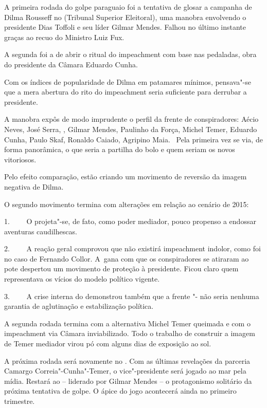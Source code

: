  

A primeira rodada do golpe paraguaio foi a tentativa de glosar a
campanha de Dilma Rousseff no  (Tribunal Superior Eleitoral), uma
manobra envolvendo o presidente Dias Toffoli e seu líder Gilmar Mendes.
Falhou no último instante graças ao recuo do Ministro Luiz Fux.

A segunda foi a de abrir o ritual do impeachment com base nas pedaladas,
obra do presidente da Câmara Eduardo Cunha.

Com os índices de popularidade de Dilma em patamares mínimos, pensava"-se
que a mera abertura do rito do impeachment seria suficiente para
derrubar a presidente.

A manobra expôs de modo imprudente o perfil da frente de conspiradores:
Aécio Neves, José Serra, , Gilmar Mendes, Paulinho da Força, Michel
Temer, Eduardo Cunha, Paulo Skaf, Ronaldo Caiado, Agripino Maia. ~Pela
primeira vez se via, de forma panorâmica, o que seria a partilha do bolo
e quem seriam os novos vitoriosos.

Pelo efeito comparação, estão criando um movimento de reversão da imagem
negativa de Dilma.

O segundo movimento termina com alterações em relação ao cenário de
2015:

1.~~~~ O  projeta"-se, de fato, como poder mediador, pouco propenso a
endossar aventuras caudilhescas.

2.~~~~ A reação geral comprovou que não existirá impeachment indolor,
como foi no caso de Fernando Collor. A~gana com que os conspiradores se
atiraram ao pote despertou um movimento de proteção à presidente. Ficou
claro quem representava os vícios do modelo político vigente.

3.~~~~ A crise interna do  demonstrou também que a frente "-
não seria nenhuma garantia de aglutinação e estabilização política.

A segunda rodada termina com a alternativa Michel Temer queimada e com o
impeachment via Câmara inviabilizado. Todo o trabalho de construir a
imagem de Temer mediador virou pó com alguns dias de exposição ao sol.

A próxima rodada será novamente no . Com as últimas revelações da
parceria Camargo Correia"-Cunha"-Temer, o vice"-presidente será jogado ao
mar pela mídia. Restará ao  -- liderado por Gilmar Mendes -- o
protagonismo solitário da próxima tentativa de golpe. O ápice do jogo
acontecerá ainda no primeiro trimestre.

